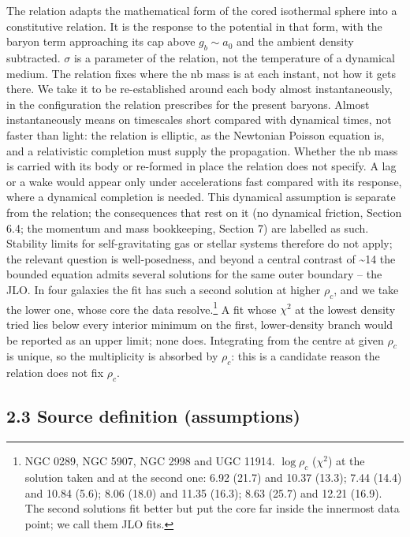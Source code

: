 \documentclass[
  10pt,
]{article}
\begin{document}
The relation adapts the mathematical form of the cored isothermal sphere into a constitutive relation. It is the response to the potential in that form, with the baryon term approaching its cap above $g_b\sim a_0$ and the ambient density subtracted. $\sigma$ is a parameter of the relation, not the temperature of a dynamical medium. The relation fixes where the nb mass is at each instant, not how it gets there. We take it to be re-established around each body almost instantaneously, in the configuration the relation prescribes for the present baryons. Almost instantaneously means on timescales short compared with dynamical times, not faster than light: the relation is elliptic, as the Newtonian Poisson equation is, and a relativistic completion must supply the propagation. Whether the nb mass is carried with its body or re-formed in place the relation does not specify. A lag or a wake would appear only under accelerations fast compared with its response, where a dynamical completion is needed. This dynamical assumption is separate from the relation; the consequences that rest on it (no dynamical friction, Section 6.4; the momentum and mass bookkeeping, Section 7) are labelled as such. Stability limits for self-gravitating gas or stellar systems therefore do not apply; the relevant question is well-posedness, and beyond a central contrast of \textasciitilde{}14 the bounded equation admits several solutions for the same outer boundary -- the JLO. In four galaxies the fit has such a second solution at higher $\rho_c$, and we take the lower one, whose core the data resolve.\footnote{NGC 0289, NGC 5907, NGC 2998 and UGC 11914. $\log\rho_c$ ($\chi^2$) at the solution taken and at the second one: 6.92 (21.7) and 10.37 (13.3); 7.44 (14.4) and 10.84 (5.6); 8.06 (18.0) and 11.35 (16.3); 8.63 (25.7) and 12.21 (16.9). The second solutions fit better but put the core far inside the innermost data point; we call them JLO fits.} A fit whose $\chi^2$ at the lowest density tried lies below every interior minimum on the first, lower-density branch would be reported as an upper limit; none does. Integrating from the centre at given $\rho_c$ is unique, so the multiplicity is absorbed by $\rho_c$: this is a candidate reason the relation does not fix $\rho_c$.

\subsection{2.3 Source definition (assumptions)}\label{source-definition-assumptions}
\end{document}
